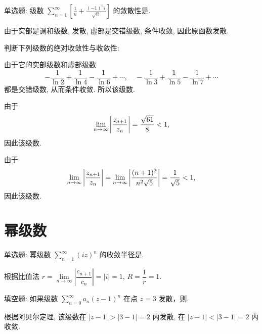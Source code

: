 \begin{exercise}
	单选题: 级数 $\displaystyle\sum_{n=1}^\infty\left[\frac1n+\frac{(-1)^ni}{\sqrt n}\right]$ 的敛散性是.
\end{exercise}
\begin{solution}[解析]
	由于实部是调和级数, 发散, 虚部是交错级数, 条件收敛, 因此原函数发散.
\end{solution}


\begin{exercise}[3]
	判断下列级数的绝对收敛性与收敛性:
\end{exercise}
\begin{solution}
	\subex 由于它的实部级数和虚部级数
	\[-\frac1{\ln2}+\frac1{\ln4}-\frac1{\ln6}+\cdots,\quad
	-\frac1{\ln3}+\frac1{\ln5}-\frac1{\ln7}+\cdots\]
	都是交错级数, 从而条件收敛. 所以该级数.

	\subex 由于
	\[\lim_{n\to\infty}\left|\frac{z_{n+1}}{z_n}\right|=\frac{\sqrt{61}}{8}<1,\]
	因此该级数.

	\subex 由于
	\[\lim_{n\to\infty}\left|\frac{z_{n+1}}{z_n}\right|=\lim_{n\to\infty}\left|\frac{(n+1)^2}{n^2\sqrt5}\right|=\frac1{\sqrt5}<1,\]
	因此该级数.
\end{solution}


\section{幂级数}


\begin{exercise}
	单选题: 幂级数 $\displaystyle\sum_{n=1}^\infty (iz)^n$ 的收敛半径是.
\end{exercise}
\begin{solution}[解析]
	根据比值法 $r=\lim\limits_{n\to\infty} \left|\dfrac{c_{n+1}}{c_n}\right|=|i|=1$, $R=\dfrac1r=1$.
\end{solution}


\begin{exercise}
	填空题: 如果级数 $\displaystyle\sum_{n=0}^\infty a_n(z-1)^n$ 在点 $z=3$ 发散，则.
\end{exercise}
\begin{solution}[解析]
	根据阿贝尔定理, 该级数在 $|z-1|>|3-1|=2$ 内发散, 在 $|z-1|<|3-1|=2$ 内收敛.
\end{solution}
	
